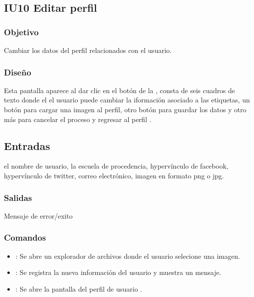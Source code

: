 \newpage
\subsection{IU10 Editar perfil}

\subsubsection{Objetivo}
	Cambiar los datos del perfil relacionados con el usuario.
	
\subsubsection{Diseño}
	Esta pantalla aparece al dar clic en el botón  de la , consta de seis cuadros de texto donde el 
	el usuario puede cambiar la iformación asociado a las etiquetas, un botón para cargar una imagen al perfil, otro botón para guardar los datos y otro más 			para cancelar el proceso y regresar al perfil 	.


\subsection{Entradas}
	el nombre de usuario, la escuela de procedencia, hypervínculo de facebook, hypervínculo de twitter, correo electrónico, imagen en formato png o jpg.

\subsubsection{Salidas}

	Mensaje de error/exito 
	

\subsubsection{Comandos}
\begin{itemize}
	\item {}: Se abre un explorador de archivos donde el usuario selecione una imagen.
	\item {}: Se registra la nueva información del usuario y muestra un mensaje.
	\item {}: Se abre la pantalla del perfil de usuario .
\end{itemize}
